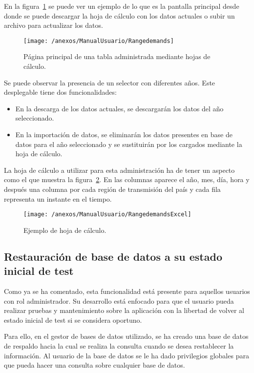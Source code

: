 En la figura~\ref{img:Rangedemands} se puede ver un ejemplo de lo que es la pantalla principal desde donde se puede descargar la hoja de cálculo con los datos actuales o subir un archivo para actualizar los datos.
 
\begin{figure}[h]
	\centering
	\texttt{[image: /anexos/ManualUsuario/Rangedemands]}
	\caption{Página principal de una tabla administrada mediante hojas de cálculo.}
	\label{img:Rangedemands}
\end{figure}

Se puede observar la presencia de un selector con diferentes años. Este desplegable tiene dos funcionalidades:
\begin{itemize}
	\item En la descarga de los datos actuales, se descargarán los datos del año seleccionado.
	\item En la importación de datos, se eliminarán los datos presentes en base de datos para el año seleccionado y se sustituirán por los cargados mediante la hoja de cálculo.
\end{itemize}

La hoja de cálculo a utilizar para esta administración ha de tener un aspecto como el que muestra la figura~\ref{img:RangedemandsExcel}. En las columnas aparece el año, mes, día, hora y después una columna por cada región de transmisión del país y cada fila representa un instante en el tiempo.

\begin{figure}[h]
	\centering
	\texttt{[image: /anexos/ManualUsuario/RangedemandsExcel]}
	\caption{Ejemplo de hoja de cálculo.}
	\label{img:RangedemandsExcel}
\end{figure}

\newpage

\subsection{Restauración de base de datos a su estado inicial de test}

Como ya se ha comentado, esta funcionalidad está presente para aquellos usuarios con rol administrador. Su desarrollo está enfocado para que el usuario pueda realizar pruebas y mantenimiento sobre la aplicación con la libertad de volver al estado inicial de test si se considera oportuno.

Para ello, en el gestor de bases de datos utilizado, se ha creado una base de datos de respaldo hacia la cual se realiza la consulta cuando se desea restablecer la información. Al usuario de la base de datos se le ha dado privilegios globales para que pueda hacer una consulta sobre cualquier base de datos.

